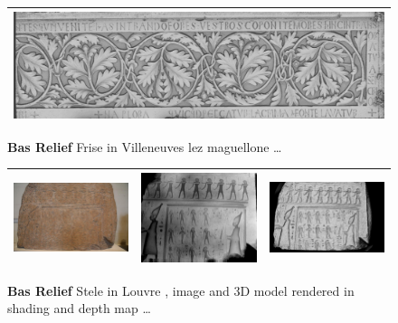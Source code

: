 \begin{figure}
\begin{tabular}{||c|c|c|c||}
   \multicolumn{4}{|c|}{\vspace{2mm} \includegraphics[width=160mm]{FIGS/SAMPLES/FrisScaledShade.jpg}} \\ \hline  \hline
\end{tabular}
\caption{{\bf Bas Relief} Frise in Villeneuves lez maguellone \dots}
\end{figure}


\begin{figure}
\begin{tabular}{||c|c|c||}
   \hline \hline 
   \includegraphics[width=60mm]{FIGS/SAMPLES/Hiero1_2908.JPG} &
   \includegraphics[width=60mm]{FIGS/SAMPLES/Hiero2_2908.JPG} &
   \includegraphics[width=60mm]{FIGS/SAMPLES/Hiero3_2908.JPG} \\ \hline  \hline 
\end{tabular}
\caption{{\bf Bas Relief} Stele in Louvre , image and 3D model rendered in shading and depth map \dots}
\end{figure}



